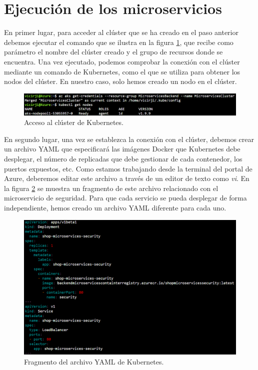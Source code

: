 \documentclass[11pt,spanish,listoffigures]{tfgetsinf}
\begin{document}
\section{Ejecución de los microservicios}


En primer lugar, para acceder al clúster que se ha creado en el paso anterior debemos ejecutar el comando que se ilustra en la figura \ref{fig:AccessCluster}, que recibe como parámetro el nombre del clúster creado y el grupo de recursos donde se encuentra. Una vez ejecutado, podemos comprobar la conexión con el clúster mediante un comando de Kubernetes, como el que se utiliza para obtener los nodos del clúster. En nuestro caso, solo hemos creado un nodo en el clúster.

\begin{figure}[h]
\centering
\includegraphics[scale=0.6]{AccessCluster}
\caption{Acceso al clúster de Kubernetes.}
\label{fig:AccessCluster}
\end{figure}

En segundo lugar, una vez se establezca la conexión con el clúster, debemos crear un archivo YAML que especificará las imágenes Docker que Kubernetes debe desplegar, el número de replicadas que debe gestionar de cada contenedor, los puertos expuestos, etc. Como estamos trabajando desde la terminal del portal de Azure, deberemos editar este archivo a través de un editor de texto como \textit{vi}. En la figura \ref{fig:KubernetesSecurity} se muestra un fragmento de este archivo relacionado con el microservicio de seguridad. Para que cada servicio se pueda desplegar de forma independiente, hemos creado un archivo YAML diferente para cada uno.

\begin{figure}[h]
\centering
\includegraphics[scale=0.6]{KubernetesSecurity}
\caption{Fragmento del archivo YAML de Kubernetes.}
\label{fig:KubernetesSecurity}
\end{figure}
\end{document}
